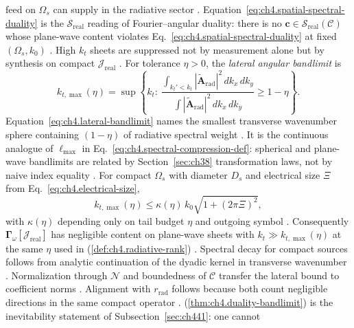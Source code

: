 feed on $\Omega_{s}$ can supply in the radiative sector \cite{devaney2004}.
Equation~\eqref{eq:ch4.spatial-spectral-duality} is the $\mathcal{S}_{\mathrm{real}}$ reading of Fourier--angular duality: there is no
\(\mathbf{c}\in\mathcal{S}_{\mathrm{real}}(\mathcal{C})\) whose plane-wave content violates
Eq.~\eqref{eq:ch4.spatial-spectral-duality} at fixed \((\Omega_{s},k_{0})\) \cite{devaney2004}. High
\(k_{t}\) sheets are suppressed not by measurement alone but by synthesis on compact \(\mathcal{J}_{\mathrm{real}}\)
\cite{stratton1941}.
\label{def:ch4.angular-bandlimit}
For tolerance \(\eta>0\), the \emph{lateral angular bandlimit} is
\begin{equation}
\label{eq:ch4.lateral-bandlimit}
k_{t,\max}(\eta)
=
\sup\left\{
k_{t}:\ 
\frac{\int_{k_{t}'<k_{t}}|\widetilde{\mathbf{A}}_{\mathrm{rad}}|^{2}\,dk_{x}\,dk_{y}}
{\int|\widetilde{\mathbf{A}}_{\mathrm{rad}}|^{2}\,dk_{x}\,dk_{y}}
\ge 1-\eta
\right\}.
\end{equation}
Equation~\eqref{eq:ch4.lateral-bandlimit} names the smallest transverse wavenumber sphere containing
\((1-\eta)\) of radiative spectral weight \cite{hansen1988}. It is the continuous analogue of
\(\ell_{\max}\) in Eq.~\eqref{eq:ch4.spectral-compression-def}: spherical and plane-wave bandlimits are
related by Section~\ref{sec:ch38} transformation laws, not by naive index equality \cite{hansen1988}.
\phantomsection\label{thm:ch4.duality-bandlimit}
For compact \(\Omega_{s}\) with diameter \(D_{s}\) and electrical size \(\Xi\) from
Eq.~\eqref{eq:ch4.electrical-size},
\begin{equation}
\label{eq:ch4.duality-bandlimit-scaling}
k_{t,\max}(\eta)
\le
\kappa(\eta)\,k_{0}\sqrt{1+(2\pi\Xi)^{2}},
\end{equation}
with \(\kappa(\eta)\) depending only on tail budget \(\eta\) and outgoing symbol
\cite{stratton1941}. Consequently \(\boldsymbol{\Gamma}_\omega[\mathcal{J}_{\mathrm{real}}]\) has
negligible content on plane-wave sheets with \(k_{t}\gg k_{t,\max}(\eta)\) at the same \(\eta\) used in
(\ref{def:ch4.radiative-rank}) \cite{devaney2004}.
Spectral decay for compact sources follows from analytic continuation of the dyadic kernel in transverse
wavenumber \cite{stratton1941}. Normalization through \(\mathcal{N}\) and boundedness of
\(\mathcal{C}\) transfer the lateral bound to coefficient norms \cite{hansen1988}. Alignment
with \(r_{\mathrm{rad}}\) follows because both count negligible directions in the same compact operator
\cite{devaney2004}.
(\ref{thm:ch4.duality-bandlimit}) is the inevitability statement of Subsection~\ref{sec:ch441}: one cannot
